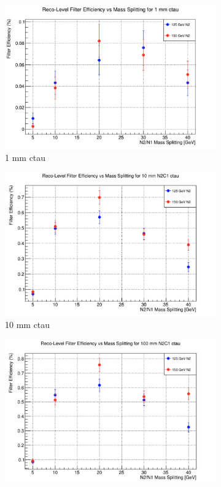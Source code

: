 \documentclass{article}
\begin{document}
\begin{figure} [H]
\begin{subfigure}{.5\textwidth}
  \centering
  \includegraphics[width=.8\linewidth]{1mmWinoEff.png}  
  \caption{1 mm ctau}
  \label{fig:sub-first18}
\end{subfigure}
\begin{subfigure}{.5\textwidth}
  \centering
  \includegraphics[width=.8\linewidth]{10mmWinoEff.png}  
  \caption{10 mm ctau}
  \label{fig:sub-second18}
\end{subfigure}
\begin{subfigure}{.5\textwidth}
  \centering
  \includegraphics[width=.8\linewidth]{100mmWinoEff.png}  

\end{subfigure}
\end{figure}
\end{document}
